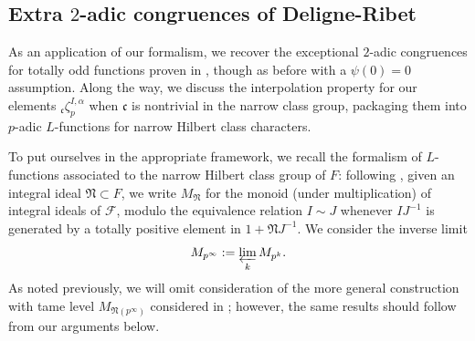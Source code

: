 \documentclass[10pt]{amsart}
\theoremstyle{definition}
\renewcommand{\c}{\mathfrak{c}}
\numberwithin{equation}{section}
\begin{document}
    \subsection{Extra $2$-adic congruences of Deligne-Ribet} \label{section:2adic}

    As an application of our formalism, we recover the exceptional $2$-adic congruences for totally odd functions proven in \cite[Theorems 8.11, 8.12]{DR}, though as before with a $\psi(0)=0$ assumption. Along the way, we discuss the interpolation property for our elements ${}_\c\zeta_p^{I,\alpha}$ when $\mathfrak{c}$ is nontrivial in the narrow class group, packaging them into $p$-adic $L$-functions for narrow Hilbert class characters.

    To put ourselves in the appropriate framework, we recall the formalism of $L$-functions associated to the narrow Hilbert class group of $F$: following \cite{Katz}, given an integral ideal $\mathfrak{N}\subset F$, we write $M_{\mathfrak{N}}$ for the monoid (under multiplication) of integral ideals of $\mathcal{F}$, modulo the equivalence relation $I\sim J$ whenever $IJ^{-1}$ is generated by a totally positive element in $1+ \mathfrak{N} J^{-1}$. We consider the inverse limit
    \[
        M_{p^\infty} := \varprojlim_k M_{p^k}.
    \]
    As noted previously, we will omit consideration of the more general construction with tame level $M_{\mathfrak{N}(p^\infty)}$ considered in \cite{Katz}; however, the same results should follow from our arguments below.
    
\end{document}
